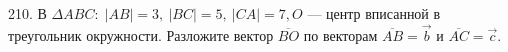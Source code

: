 210. В $\Delta ABC:\; |AB| = 3,\ |BC| = 5,\ |CA| = 7, O$ --- центр вписанной в треугольник окружности.
Разложите вектор  $\overline{BO}$ по векторам  $\overline{AB}=\vec{b}$ и  $\overline{AC}=\vec{c}.$\\

